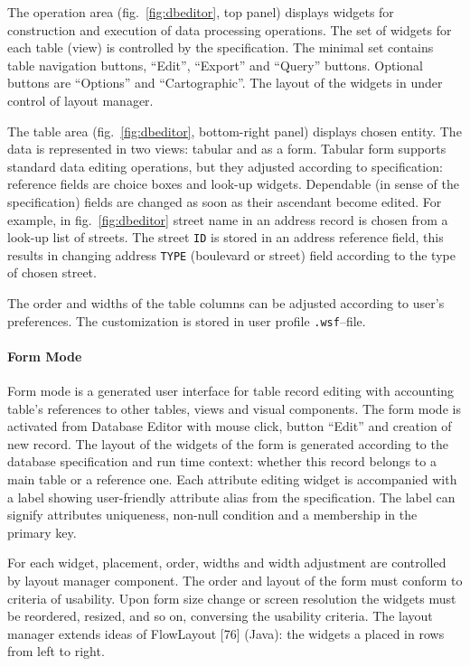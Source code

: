 \documentclass[conference]{IEEEtran}
\begin{document}
The operation area (fig.~\ref{fig:dbeditor}, top panel) displays widgets for construction and execution of data processing operations.  The set of widgets for each table (view) is controlled by the specification.  The minimal set contains table navigation buttons, ``Edit'', ``Export'' and ``Query'' buttons.  Optional buttons are ``Options'' and ``Cartographic''.  The layout of the widgets in under control of layout manager.

The table area (fig.~\ref{fig:dbeditor}, bottom-right panel) displays chosen entity.  The data is represented in two views: tabular and as a form.  Tabular form supports standard data editing operations, but they adjusted according to specification: reference fields are choice boxes and look-up widgets.  Dependable (in sense of the specification) fields are changed as soon as their ascendant become edited.  For example, in fig.~\ref{fig:dbeditor} street name in an address record is chosen from a look-up list of streets.  The street \texttt{ID} is stored in an address reference field, this results in changing address \texttt{TYPE} (boulevard or street) field according to the type of chosen street.

The order and widths of the table columns can be adjusted according to user's preferences.  The customization is stored in user profile \texttt{.wsf}--file.

\paragraph{Form Mode}

Form mode is a generated user interface for table record editing with accounting table's references to other tables, views and visual components.  The form mode is activated from Database Editor with mouse click, button ``Edit'' and creation of new record.  The layout of the widgets of the form is generated according to the database specification and run time context: whether this record belongs to a main table or a reference one.  Each attribute editing widget is accompanied with a label showing user-friendly attribute alias from the specification.  The label can signify attributes uniqueness, non-null condition and a membership in the primary key.

For each widget, placement, order, widths and width adjustment are controlled by layout manager component.  The order and layout of the form must conform to criteria of usability.  Upon form size change or screen resolution the widgets must be reordered, resized, and so on, conversing the usability criteria.  The layout manager extends ideas of FlowLayout [76] (Java): the widgets a placed in rows from left to right.
\end{document}
